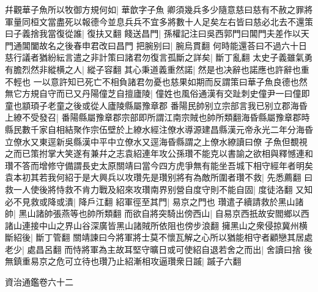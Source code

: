 幷觀華子魚所以牧御方規何如|{
	華歆字子魚}
卿須幾兵多少隨意慈曰慈有不赦之罪將軍量同桓文當盡死以報德今並息兵兵不宜多將數十人足矣左右皆曰慈必北去不還策曰子義捨我當復從誰|{
	復扶又翻}
餞送昌門|{
	孫權記注曰吳西郭門曰閶門夫差作以天門通閶闔故名之後春申君改曰昌門}
把腕别曰|{
	腕烏貫翻}
何時能還荅曰不過六十日慈行議者猶紛紜言遣之非計策曰諸君勿復言孤斷之詳矣|{
	斷丁亂翻}
太史子義雖氣勇有膽烈然非縱横之人|{
	縱子容翻}
其心秉道義重然諾|{
	然是也决辭也諾應也許辭也重不輕也}
一以意許知已死亡不相負諸君勿憂也慈果如期而反謂策曰華子魚良德也然無它方規自守而已又丹陽僮芝自擅廬陵|{
	僮姓也風俗通漢有交趾刺史僮尹一曰僮即童也顓頊子老童之後或從人廬陵縣屬豫章郡}
番陽民帥别立宗部言我已别立郡海昏上繚不受發召|{
	番陽縣屬豫章郡宗部即所謂江南宗賊也帥所類翻海昏縣屬豫章郡時縣民數千家自相結聚作宗伍壁於上繚水經注僚水導源建昌縣漢元帝永光二年分海昏立僚水又東逕新吳縣漢中平中立僚水又逕海昏縣謂之上僚水繚讀曰僚}
子魚但覩視之而已策拊掌大笑遂有兼幷之志袁紹連年攻公孫瓚不能克以書諭之欲相與釋憾連和瓚不答而增修守備謂長史太原關靖曰當今四方虎爭無有能坐吾城下相守經年者明矣袁本初其若我何紹于是大興兵以攻瓚先是瓚别將有為敵所圍者瓚不救|{
	先悉薦翻}
曰救一人使後將恃救不肯力戰及紹來攻瓚南界别營自度守則不能自固|{
	度徒洛翻}
又知必不見救或降或潰|{
	降戶江翻}
紹軍徑至其門|{
	易京之門也}
瓚遣子續請救於黑山諸帥|{
	黑山諸帥張燕等也帥所類翻}
而欲自將突騎出傍西山|{
	自易京西扺故安閻鄉以西諸山連接中山之界山谷深廣皆黑山諸賊所依阻也傍步浪翻}
擁黑山之衆侵掠冀州横斷紹後|{
	斷丁管翻}
關靖諫曰今將軍將士莫不懷瓦解之心所以猶能相守者顧戀其居處老少|{
	處昌呂翻}
而恃將軍為主故耳堅守曠日或可使紹自退若舍之而出|{
	舍讀曰捨}
後無鎮重易京之危可立待也瓚乃止紹漸相攻逼瓚衆日䠞|{
	䠞子六翻}


資治通鑑卷六十二
